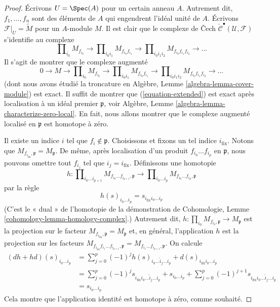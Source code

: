 \begin{proof}
Écrivons $U = \Spec(A)$ pour un certain anneau $A$. Autrement dit,
$f_1, \ldots, f_n$
sont des éléments de $A$ qui engendrent l'idéal unité de $A$. Écrivons
$\mathcal{F}|_U = \widetilde{M}$ pour un $A$-module $M$. Il est clair que le
complexe de {\v C}ech $\check{\mathcal{C}}^\bullet(\mathcal{U}, \mathcal{F})$
s'identifie au complexe
$$
\prod\nolimits_{i_0} M_{f_{i_0}} \to
\prod\nolimits_{i_0i_1} M_{f_{i_0}f_{i_1}} \to
\prod\nolimits_{i_0i_1i_2} M_{f_{i_0}f_{i_1}f_{i_2}} \to
\ldots
$$
Il s'agit de montrer que le complexe augmenté
\begin{equation}
\label{equation-extended}
0 \to
M \to
\prod\nolimits_{i_0} M_{f_{i_0}} \to
\prod\nolimits_{i_0i_1} M_{f_{i_0}f_{i_1}} \to
\prod\nolimits_{i_0i_1i_2} M_{f_{i_0}f_{i_1}f_{i_2}} \to
\ldots
\end{equation}
(dont nous avons étudié la troncature en Algèbre, Lemme
\ref{algebra-lemma-cover-module}) est exact. Il suffit de montrer que
(\ref{equation-extended}) est exact après localisation à un idéal premier
$\mathfrak p$, voir Algèbre, Lemme \ref{algebra-lemma-characterize-zero-local}.
En fait, nous allons montrer que le complexe augmenté localisé en
$\mathfrak p$ est homotope à zéro.

\medskip\noindent
Il existe un indice $i$ tel que $f_i \not \in \mathfrak p$. Choisissons et
fixons un tel indice $i_{\text{fix}}$. Notons que
$M_{f_{i_{\text{fix}}}, \mathfrak p} = M_{\mathfrak p}$. De même, après
localisation d'un produit $f_{i_0} \ldots f_{i_p}$ en $\mathfrak p$, nous
pouvons omettre tout $f_{i_j}$ tel que $i_j = i_{\text{fix}}$. Définissons une
homotopie
$$
h :
\prod\nolimits_{i_0 \ldots i_{p + 1}}
M_{f_{i_0} \ldots f_{i_{p + 1}}, \mathfrak p}
\longrightarrow
\prod\nolimits_{i_0 \ldots i_p}
M_{f_{i_0} \ldots f_{i_p}, \mathfrak p}
$$
par la règle
$$
h(s)_{i_0 \ldots i_p} = s_{i_{\text{fix}} i_0 \ldots i_p}
$$
(C'est le « dual » de l'homotopie de la démonstration de Cohomologie, Lemme
\ref{cohomology-lemma-homology-complex}.) Autrement dit, $h : \prod_{i_0} M_{f_{i_0}, \mathfrak p} \to M_\mathfrak p$ est la projection sur le facteur
$M_{f_{i_{\text{fix}}}, \mathfrak p} = M_{\mathfrak p}$ et, en général,
l'application $h$ est la projection sur les facteurs
$M_{f_{i_{\text{fix}}} f_{i_1} \ldots f_{i_{p + 1}}, \mathfrak p}
= M_{f_{i_1} \ldots f_{i_{p + 1}}, \mathfrak p}$. On calcule
\begin{align*}
(dh + hd)(s)_{i_0 \ldots i_p}
& =
\sum\nolimits_{j = 0}^p
(-1)^j
h(s)_{i_0 \ldots \hat i_j \ldots i_p}
+
d(s)_{i_{\text{fix}} i_0 \ldots i_p}\\
& =
\sum\nolimits_{j = 0}^p
(-1)^j
s_{i_{\text{fix}} i_0 \ldots \hat i_j \ldots i_p}
+
s_{i_0 \ldots i_p}
+
\sum\nolimits_{j = 0}^p
(-1)^{j + 1}
s_{i_{\text{fix}} i_0 \ldots \hat i_j \ldots i_p} \\
& =
s_{i_0 \ldots i_p}
\end{align*}
Cela montre que l'application identité est homotope à zéro, comme souhaité.
\end{proof}

